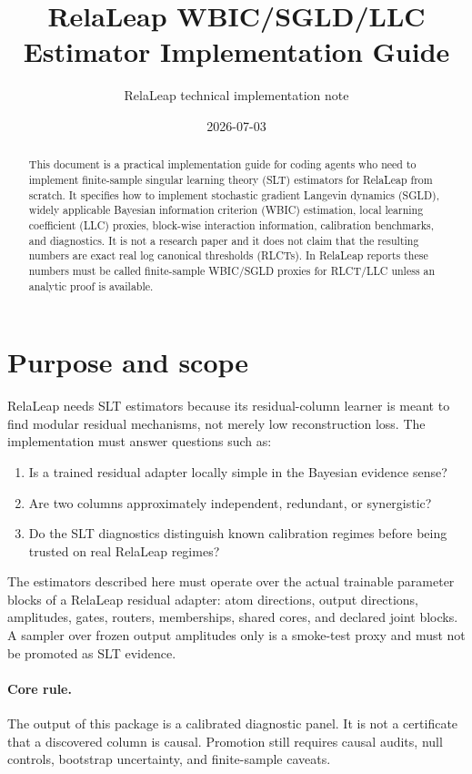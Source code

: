 \documentclass[11pt]{article}
\title{RelaLeap WBIC/SGLD/LLC Estimator Implementation Guide}
\author{RelaLeap technical implementation note}
\date{2026-07-03}
\begin{document}
\maketitle

\begin{abstract}
This document is a practical implementation guide for coding agents who need to implement finite-sample singular learning theory (SLT) estimators for RelaLeap from scratch.  It specifies how to implement stochastic gradient Langevin dynamics (SGLD), widely applicable Bayesian information criterion (WBIC) estimation, local learning coefficient (LLC) proxies, block-wise interaction information, calibration benchmarks, and diagnostics.  It is not a research paper and it does not claim that the resulting numbers are exact real log canonical thresholds (RLCTs).  In RelaLeap reports these numbers must be called finite-sample WBIC/SGLD proxies for RLCT/LLC unless an analytic proof is available.
\end{abstract}

\tableofcontents

\section{Purpose and scope}

RelaLeap needs SLT estimators because its residual-column learner is meant to find modular residual mechanisms, not merely low reconstruction loss.  The implementation must answer questions such as:
\begin{enumerate}[(1)]
\item Is a trained residual adapter locally simple in the Bayesian evidence sense?
\item Are two columns approximately independent, redundant, or synergistic?
\item Do the SLT diagnostics distinguish known calibration regimes before being trusted on real RelaLeap regimes?
\end{enumerate}

The estimators described here must operate over the actual trainable parameter blocks of a RelaLeap residual adapter: atom directions, output directions, amplitudes, gates, routers, memberships, shared cores, and declared joint blocks.  A sampler over frozen output amplitudes only is a smoke-test proxy and must not be promoted as SLT evidence.

\paragraph{Core rule.}  The output of this package is a calibrated diagnostic panel.  It is not a certificate that a discovered column is causal.  Promotion still requires causal audits, null controls, bootstrap uncertainty, and finite-sample caveats.
\end{document}
